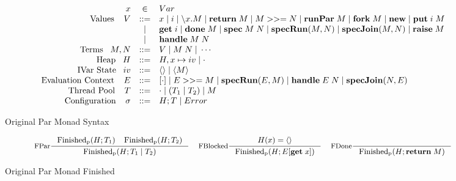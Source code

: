 \begin{figure}
\begin{displaymath}
\begin{array}{rcll}
x &\in& Var \\

\text{Values} \;\;\;\; V & ::= & x \; | \; i \; | \; \backslash x. M  \; | \; \return \; M \; | \; M >>= N \; | \; \runPar \; M \; | \; \fork \; M \; | \; \new \; | \; \putKW \; i \; M \\
& | & \getKW \; i \; | \;  \doneKW \; M \; | \; \specKW \; M \; N \; | \; \specRunKW(M, N) \; | \; \specJoinKW(M, N) \; | \; \raiseKW \; M \\
& | & \handleKW \; M \; N  \\

\text{Terms} \;\;\; M, N &::=&  V \;| \;M \; N \; | \; \cdots\\

\text{Heap} \;\;\; H &::=& H, x \mapsto iv \; | \; \cdot \\

\text{IVar State} \;\;\; iv &::=& \langle \rangle \; | \; \langle M\rangle \\

\text{Evaluation Context} \;\;\;\; E &::=& [\cdot] \; | \; E >>= M \; | \; \specRunKW(E, M) \; | \; \handleKW \; E \; N \; | \; \specJoinKW(N, E) \\

\text{Thread Pool} \;\;\;\; T &::=& \cdot \; | \; (T_1 \; | \; T_2) \; | \; M \\

\text{Configuration} \;\;\;\; \sigma &::=& H; T \; | \; Error \\
\end{array}
\end{displaymath}
\caption{Original Par Monad Syntax}
\label{fig:par-syntax}
\end{figure}

\begin{figure}
\[
\mbox{\small
\inference[\text{FPar}]{\pFinished(H; T_1) \;\;\;\; \pFinished(H; T_2)}{\pFinished(H; T_1 \; | \; T_2)} \;\;\;
\inference[\text{FBlocked}]{H(x) = \langle\rangle}{\pFinished(H; \eval{\getKW \; x})} \;\;\;
\inference[\text{FDone}]{}{\pFinished(H; \return \; M)}
}
\]

\caption{Original Par Monad Finished}
\label{fig:par-finished}

\end{figure}

